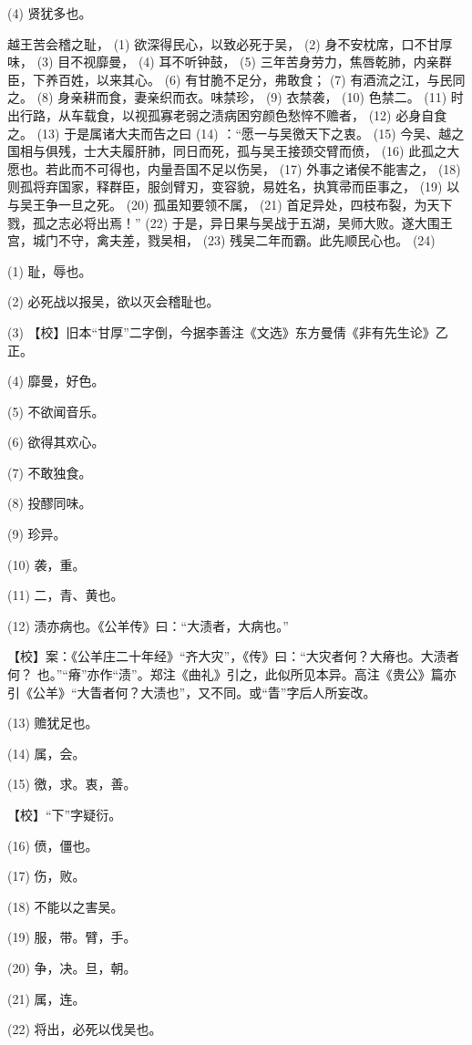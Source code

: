 \documentclass[12pt,UTF8]{ctexbook}
\begin{document}
(4) 贤犹多也。

越王苦会稽之耻， (1) 欲深得民心，以致必死于吴， (2) 身不安枕席，口不甘厚味， (3) 目不视靡曼， (4) 耳不听钟鼓， (5) 三年苦身劳力，焦唇乾肺，内亲群臣，下养百姓，以来其心。 (6) 有甘脆不足分，弗敢食； (7) 有酒流之江，与民同之。 (8) 身亲耕而食，妻亲织而衣。味禁珍， (9) 衣禁袭， (10) 色禁二。 (11) 时出行路，从车载食，以视孤寡老弱之渍病困穷颜色愁悴不赡者， (12) 必身自食之。 (13) 于是属诸大夫而告之曰 (14) ：“愿一与吴徼天下之衷。 (15) 今吴、越之国相与俱残，士大夫履肝肺，同日而死，孤与吴王接颈交臂而偾， (16) 此孤之大愿也。若此而不可得也，内量吾国不足以伤吴， (17) 外事之诸侯不能害之， (18) 则孤将弃国家，释群臣，服剑臂刃，变容貌，易姓名，执箕帚而臣事之， (19) 以与吴王争一旦之死。 (20) 孤虽知要领不属， (21) 首足异处，四枝布裂，为天下戮，孤之志必将出焉！” (22) 于是，异日果与吴战于五湖，吴师大败。遂大围王宫，城门不守，禽夫差，戮吴相， (23) 残吴二年而霸。此先顺民心也。 (24)

(1) 耻，辱也。

(2) 必死战以报吴，欲以灭会稽耻也。

(3) 【校】旧本“甘厚”二字倒，今据李善注《文选》东方曼倩《非有先生论》乙正。

(4) 靡曼，好色。

(5) 不欲闻音乐。

(6) 欲得其欢心。

(7) 不敢独食。

(8) 投醪同味。

(9) 珍异。

(10) 袭，重。

(11) 二，青、黄也。

(12) 渍亦病也。《公羊传》曰：“大渍者，大病也。”

【校】案：《公羊庄二十年经》“齐大灾”，《传》曰：“大灾者何？大瘠也。大渍者何？ 也。”“瘠”亦作“渍”。郑注《曲礼》引之，此似所见本异。高注《贵公》篇亦引《公羊》“大眚者何？大渍也”，又不同。或“眚”字后人所妄改。

(13) 赡犹足也。

(14) 属，会。

(15) 徼，求。衷，善。

【校】“下”字疑衍。

(16) 偾，僵也。

(17) 伤，败。

(18) 不能以之害吴。

(19) 服，带。臂，手。

(20) 争，决。旦，朝。

(21) 属，连。

(22) 将出，必死以伐吴也。
\end{document}
